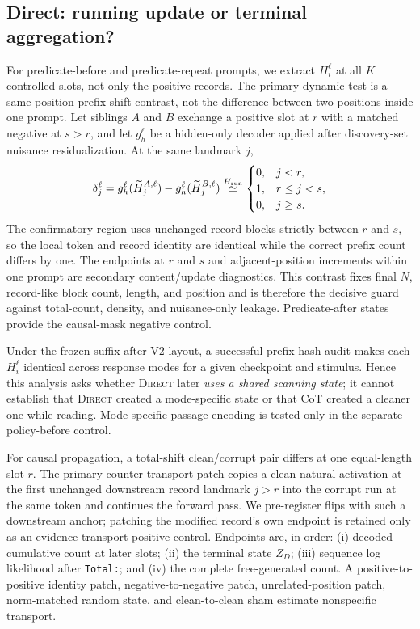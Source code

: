 \documentclass[10pt,twocolumn]{article}
\newcommand{\direct}{\textsc{Direct}\xspace}
\begin{document}
\subsection{Direct: running update or terminal aggregation?}
For predicate-before and predicate-repeat prompts, we extract $H_i^\ell$ at all $K$ controlled
slots, not only the positive records. The primary dynamic test is a same-position
prefix-shift contrast, not the difference between two positions inside one prompt. Let siblings
$A$ and $B$ exchange a positive slot at $r$ with a matched negative at $s>r$, and let
$g_h^\ell$ be a hidden-only decoder applied after discovery-set nuisance residualization. At the
same landmark $j$,
\[
 \delta_j^\ell=
 g_h^\ell(\widetilde H_{j}^{A,\ell})
 -g_h^\ell(\widetilde H_{j}^{B,\ell})
 \stackrel{H_{\rm run}}{\simeq}
 \begin{cases}
  0,&j<r,\\
  1,&r\leq j<s,\\
  0,&j\geq s.
 \end{cases}
\]
The confirmatory region uses unchanged record blocks strictly between $r$ and $s$, so the local
token and record identity are identical while the correct prefix count differs by one. The
endpoints at $r$ and $s$ and adjacent-position increments within one prompt are secondary
content/update diagnostics. This contrast fixes final $N$, record-like block count, length, and
position and is therefore the decisive guard against total-count, density, and nuisance-only
leakage. Predicate-after states provide the causal-mask negative control.

Under the frozen suffix-after V2 layout, a successful prefix-hash audit makes each $H_i^\ell$
identical across response modes for a given checkpoint and stimulus. Hence this analysis asks
whether \direct later \emph{uses a shared scanning state}; it cannot establish that \direct
created a mode-specific state or that CoT created a cleaner one while reading. Mode-specific
passage encoding is tested only in the separate policy-before control.

For causal propagation, a total-shift clean/corrupt pair differs at one equal-length slot $r$.
The primary counter-transport patch copies a clean natural activation at the first unchanged
downstream record landmark $j>r$ into the corrupt run at the same token and continues the
forward pass. We pre-register flips with such a downstream anchor; patching the modified
record's own endpoint is retained only as an evidence-transport positive control. Endpoints are,
in order:
(i) decoded cumulative count at later slots; (ii) the terminal state $Z_D$; (iii) sequence log
likelihood after \texttt{Total:}; and (iv) the complete free-generated count. A positive-to-
positive identity patch, negative-to-negative patch, unrelated-position patch, norm-matched
random state, and clean-to-clean sham estimate nonspecific transport.
\end{document}
